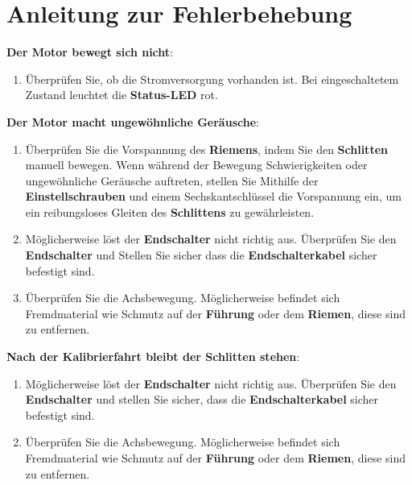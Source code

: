 %
%

\chapter{Anleitung zur Fehlerbehebung}

	
	\textbf{Der Motor bewegt sich nicht}:
	\begin{enumerate}
		\item Überprüfen Sie, ob die Stromversorgung vorhanden ist. Bei eingeschaltetem Zustand leuchtet die \textbf{Status-LED} rot.
	\end{enumerate}
		\textbf{Der Motor macht ungewöhnliche Geräusche}:
	\begin{enumerate} 
		\item Überprüfen Sie die Vorspannung des \textbf{Riemens}, indem Sie den \textbf{Schlitten} manuell bewegen. Wenn während der Bewegung Schwierigkeiten oder ungewöhnliche Geräusche auftreten, stellen Sie Mithilfe der \textbf{Einstellschrauben} und einem Sechskantschlüssel die Vorspannung ein, um ein reibungsloses Gleiten des \textbf{Schlittens} zu gewährleisten.

		\item Möglicherweise löst der \textbf{Endschalter} nicht richtig aus. Überprüfen Sie den \textbf{Endschalter} und Stellen Sie sicher dass die \textbf{Endschalterkabel} sicher befestigt sind.
				
		\item Überprüfen Sie die Achsbewegung. Möglicherweise befindet sich Fremdmaterial wie Schmutz auf der \textbf{Führung} oder dem \textbf{Riemen}, diese sind zu entfernen. 
\end{enumerate}
	\textbf{Nach der Kalibrierfahrt bleibt der Schlitten stehen}:
	\begin{enumerate}
		\item Möglicherweise löst der \textbf{Endschalter} nicht richtig aus. Überprüfen Sie den \textbf{Endschalter} und stellen Sie sicher, dass die \textbf{Endschalterkabel} sicher befestigt sind.
		\item Überprüfen Sie die Achsbewegung. Möglicherweise befindet sich Fremdmaterial wie Schmutz auf der \textbf{Führung} oder dem \textbf{Riemen}, diese sind zu entfernen. 
	\end{enumerate}